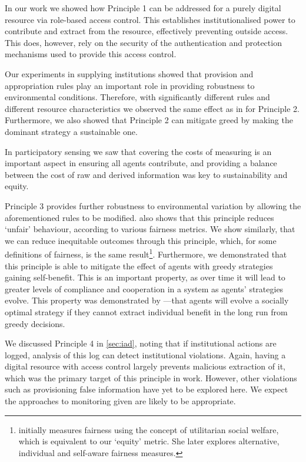 In our work we showed how Principle 1 can be addressed for a purely digital resource via
role-based access control. This establishes institutionalised power to
contribute and extract from the resource, effectively preventing outside access.
This does, however, rely on the security of the authentication and
protection mechanisms used to provide this access control. 

Our experiments in supplying institutions showed that provision and
appropriation rules play an important role in providing robustness to
environmental conditions. Therefore, with significantly different rules and
different resource characteristics we observed the same effect as in
\citet{Pitt2012b} for Principle 2. Furthermore, we also showed that Principle 2
can mitigate greed by making the dominant strategy a sustainable one.

In participatory sensing we saw that covering the costs of measuring is an
important aspect in ensuring all agents contribute, and providing a balance
between the cost of raw and derived information was key to sustainability and
equity.

Principle 3 provides further robustness to environmental variation by allowing
the aforementioned rules to be modified. \citet{Schaumeier2013} also shows
that this principle reduces `unfair' behaviour, according to various fairness
metrics. We show similarly, that we can reduce inequitable outcomes through
this principle, which, for some definitions of fairness, is the same
result\footnote{\citet{Schaumeier2013} initially measures fairness using the
concept of utilitarian social welfare, which is equivalent to our `equity'
metric. She later explores alternative, individual and self-aware fairness
measures.}. Furthermore, we demonstrated that this principle is able to mitigate the
effect of agents with greedy strategies gaining self-benefit. This is an
important property, as over time it will lead to greater levels of compliance
and cooperation in a system as agents' strategies evolve. This property was
demonstrated by \citet{Axelrod1984}---that agents will evolve a socially
optimal strategy if they cannot extract individual benefit in the long run
from greedy decisions.

We discussed Principle 4 in \autoref{sec:iad}, noting that if institutional
actions are logged, analysis of this log can detect institutional violations.
Again, having a digital resource with access control largely prevents
malicious extraction of it, which was the primary target of this principle in
 work. However, other violations such as
provisioning false information have yet to be explored here. We expect the
approaches to monitoring given are likely to be appropriate. %

